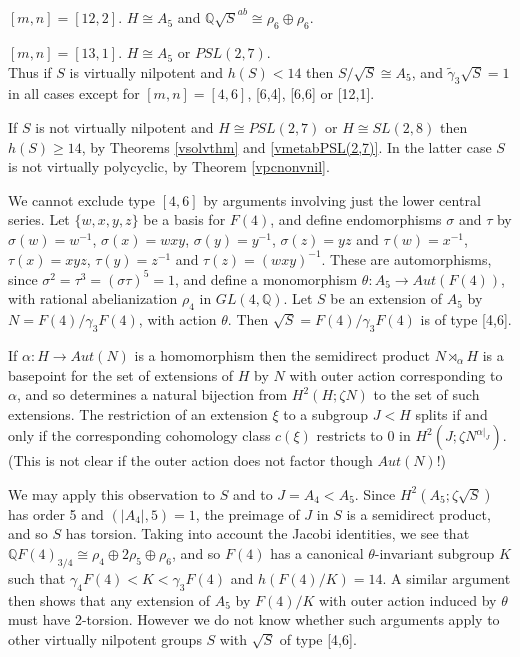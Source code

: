 \documentclass[12pt]{amsart}
\renewcommand{\geq}{\geqslant}
\begin{document}
$[m,n]=[12,2]$.  $H\cong{A_5}$ and $\mathbb{Q}\sqrt{S}^{ab}\cong\rho_6\oplus\rho_6$.

$[m,n]=[13,1]$.  $H\cong{A_5}$ or $PSL(2,7)$.\\
Thus if $S$ is virtually nilpotent and $h(S)<14$ then $S/\sqrt{S}\cong{A_5}$,
and $\tilde\gamma_3\sqrt{S}=1$ in all cases except for $[m,n]=[4,6]$, [6,4], [6,6]
or [12,1].

If $S$ is not virtually nilpotent and $H\cong{PSL(2,7)}$  
or $H\cong{SL(2,8)}$ then $h(S)\geq14$, 
by Theorems \ref{vsolvthm} and \ref{vmetabPSL(2,7)}.
In the latter case $S$ is not virtually polycyclic, by Theorem \ref{vpcnonvnil}.

We cannot exclude type $[4,6]$ by arguments involving just the lower central series.
Let $\{w,x,y,z\}$ be a basis for $F(4)$,
and define endomorphisms $\sigma$ and $\tau$ by
$\sigma(w)=w^{-1}$, $\sigma(x)=wxy$, $\sigma(y)=y^{-1}$,
$\sigma (z)=yz$ and $\tau(w)=x^{-1}$, $\tau(x)=xyz$, $\tau(y)=z^{-1}$ and
$\tau(z)=(wxy)^{-1}$.
These are automorphisms,
since $\sigma^2=\tau^3=(\sigma\tau)^5=1$,
and define a monomorphism $\theta:A_5\to{Aut(F(4))}$,
with rational abelianization $\rho_4$ in $GL(4,\mathbb{Q})$.
Let $S$ be an extension of $A_5$ by $N=F(4)/\gamma_3F(4)$,
with action $\theta$.
Then $\sqrt{S}=F(4)/\gamma_3F(4)$ is of type [4,6].

If $\alpha:H\to{Aut(N)}$ is a homomorphism then the semidirect product
$N\rtimes_\alpha{H}$ is a basepoint for the set of extensions of $H$ by $N$ with
outer action corresponding to $\alpha$, and so determines a natural bijection from
$H^2(H;\zeta{N})$ to the set of such extensions.
The restriction of an extension $\xi$ to a subgroup $J<H$ splits
if and only if the corresponding cohomology class $c(\xi)$ restricts to 0
in $H^2(J;\zeta{N}^{\alpha|_J})$.
(This is not clear if the outer action does not factor though $Aut(N)$!)

We may apply this observation to $S$ and to $J=A_4<A_5$.
Since $H^2(A_5;\zeta\sqrt{S})$ has order 5 \cite[page 273]{HP} and $(|A_4|,5)=1$, 
the preimage of $J$ in $S$ is a semidirect product,
and so $S$ has torsion.
Taking into account the Jacobi identities,
we see that $\mathbb{Q}F(4)_{3/4}\cong\rho_4\oplus2\rho_5\oplus\rho_6$,
and so $F(4)$ has a canonical $\theta$-invariant subgroup $K$ such that
$\gamma_4F(4)<K<\gamma_3F(4)$ and $h(F(4)/K)=14$.
A similar argument then shows that any extension of $A_5$ by $F(4)/K$ 
with outer action induced by $\theta$ must have 2-torsion.
However we do not know whether such arguments apply
to other virtually nilpotent groups $S$ with $\sqrt{S}$ of type [4,6].
\end{document}
